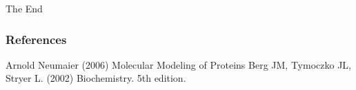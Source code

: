 \documentclass{beamer}
\begin{document}

\begin{frame}
\Huge{\centerline{The End}}
\end{frame}


\begin{frame}
\frametitle{References}
\footnotesize{
\begin{thebibliography}{99} %
 Arnold Neumaier (2006)
\newblock Molecular Modeling of Proteins
 Berg JM, Tymoczko JL, Stryer L. (2002)
\newblock Biochemistry. 5th edition.
\end{thebibliography}
}
\end{frame}

\end{document}
